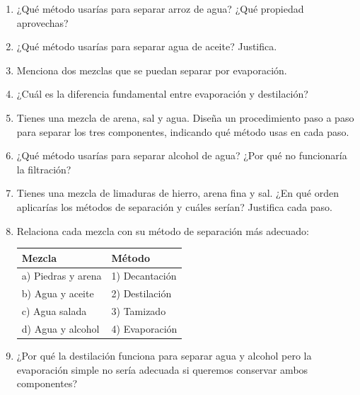 \documentclass[12pt, letterpaper]{article}
\begin{document}
\begin{enumerate}[leftmargin=*, resume]
  \item \facil{} ¿Qué método usarías para separar arroz de agua? ¿Qué propiedad aprovechas?

  \item \facil{} ¿Qué método usarías para separar agua de aceite? Justifica.

  \item \facil{} Menciona dos mezclas que se puedan separar por evaporación.

  \item \facil{} ¿Cuál es la diferencia fundamental entre evaporación y destilación?

  \item \medio{} Tienes una mezcla de arena, sal y agua. Diseña un procedimiento paso a paso para separar los tres componentes, indicando qué método usas en cada paso.

  \item \medio{} ¿Qué método usarías para separar alcohol de agua? ¿Por qué no funcionaría la filtración?

  \item \medio{} Tienes una mezcla de limaduras de hierro, arena fina y sal. ¿En qué orden aplicarías los métodos de separación y cuáles serían? Justifica cada paso.

  \item \medio{} Relaciona cada mezcla con su método de separación más adecuado:
        \begin{center}
          \small
          \begin{tabular}{ll}
            \toprule
            \textbf{Mezcla}    & \textbf{Método} \\
            \midrule
            a) Piedras y arena & 1) Decantación  \\
            b) Agua y aceite   & 2) Destilación  \\
            c) Agua salada     & 3) Tamizado     \\
            d) Agua y alcohol  & 4) Evaporación  \\
            \bottomrule
          \end{tabular}
        \end{center}

  \item \dificil{} ¿Por qué la destilación funciona para separar agua y alcohol pero la evaporación simple no sería adecuada si queremos conservar ambos componentes?


\end{enumerate}
\end{document}

